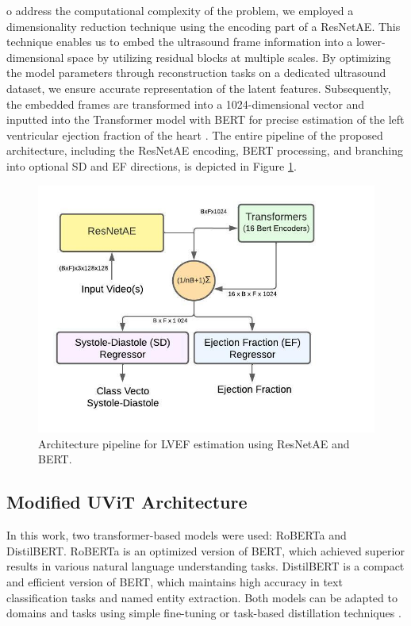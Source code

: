 \documentclass[a4paper,fleqn]{cas-dc}
\begin{document}
o address the computational complexity of the problem, we employed a dimensionality reduction technique using the encoding part of a ResNetAE. This technique enables us to embed the ultrasound frame information into a lower-dimensional space by utilizing residual blocks at multiple scales. By optimizing the model parameters through reconstruction tasks on a dedicated ultrasound dataset, we ensure accurate representation of the latent features. Subsequently, the embedded frames are transformed into a 1024-dimensional vector and inputted into the Transformer model with BERT for precise estimation of the left ventricular ejection fraction of the heart \cite{Reynald}. The entire pipeline of the proposed architecture, including the ResNetAE encoding, BERT processing, and branching into optional SD and EF directions, is depicted in Figure \ref{FIG:1}.

\begin{figure}
	\centering
		\includegraphics[scale=.75]{Diagrama em branco (1).jpeg}
	\caption{Architecture pipeline for LVEF estimation using ResNetAE and BERT.}
	\label{FIG:1}
\end{figure}

\subsection{Modified UViT Architecture} \label{sub:Modified UViT Architecture}

In this work, two transformer-based models were used: RoBERTa and DistilBERT. RoBERTa is an optimized version of BERT, which achieved superior results in various natural language understanding tasks. DistilBERT is a compact and efficient version of BERT, which maintains high accuracy in text classification tasks and named entity extraction. Both models can be adapted to domains and tasks using simple fine-tuning or task-based distillation techniques \cite{Roberta, DBLP:journals/corr/abs-1910-01108}.
\end{document}
